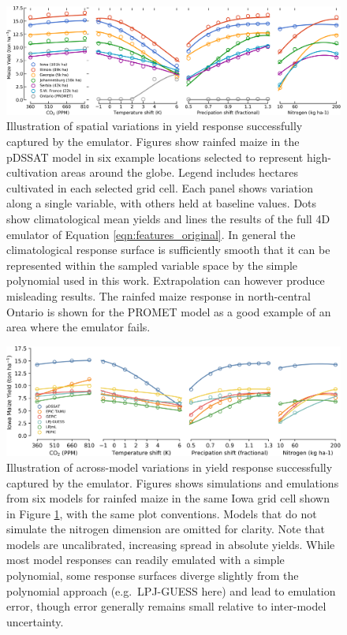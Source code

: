 \documentclass[gmd, manuscript]{copernicus} %
\begin{document}
\begin{figure}[ht]
\centering
    \includegraphics[width=16cm]{figures/regression_example_1.png}
    \caption{
    Illustration of spatial variations in yield response successfully captured by the emulator. 
    Figures show rainfed maize in the pDSSAT model in six example locations selected to represent high-cultivation areas around the globe. 
    Legend includes hectares cultivated in each selected grid cell. 
    Each panel shows variation along a single variable, with others held at baseline values. 
    Dots show climatological mean yields and lines the results of the full 4D emulator of Equation \ref{eqn:features_original}. 
    In general the climatological response surface is sufficiently smooth that it can be represented within the sampled variable space by the simple polynomial used in this work. 
    Extrapolation can however produce misleading results. 
    The rainfed maize response in north-central Ontario is shown for the PROMET model as a good example of an area where the emulator fails.
    }
   \label{fig:regression}
\end{figure}

\begin{figure}[ht]
\centering
    \includegraphics[width=16cm]{figures/regression_example_2.png}
    \caption{
    Illustration of across-model variations in yield response successfully captured by the emulator. 
    Figures shows simulations and emulations from six models for rainfed maize in the same Iowa grid cell shown in Figure \ref{fig:regression}, with the same plot conventions. 
    Models that do not simulate the nitrogen dimension are omitted for clarity. 
    Note that models are uncalibrated, increasing spread in absolute yields. 
    While most model responses can readily emulated with a simple polynomial, some response surfaces diverge slightly from the polynomial approach (e.g.\ LPJ-GUESS here) and lead to emulation error, though error generally remains small relative to inter-model uncertainty. 
    }
   \label{fig:regression_2}
\end{figure}
\end{document}
